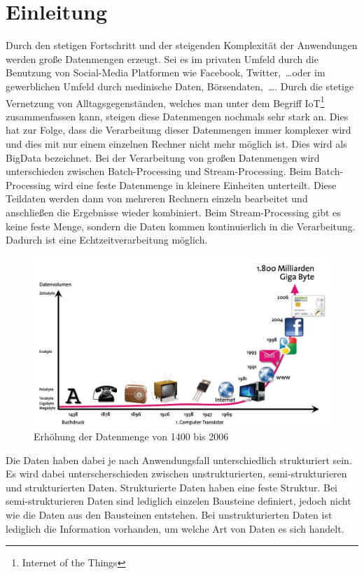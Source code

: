 \chapter{Einleitung}
Durch den stetigen Fortschritt und der steigenden Komplexität der Anwendungen
werden große Datenmengen erzeugt. Sei es im privaten Umfeld durch die Benutzung
von Social-Media Platformen wie Facebook, Twitter,~\dots oder im gewerblichen
Umfeld durch medinische Daten, Börsendaten,~\dots . Durch die stetige Vernetzung
von Alltagsgegenständen, welches man unter dem Begriff IoT\footnote{Internet of the Things}
zusammenfassen kann, steigen diese Datenmengen nochmals sehr stark an. Dies hat
zur Folge, dass die Verarbeitung dieser Datenmengen immer komplexer wird und dies
mit nur einem einzelnen Rechner nicht mehr möglich ist. Dies wird als BigData
bezeichnet. Bei der Verarbeitung von großen Datenmengen wird unterschieden
zwischen Batch-Processing und Stream-Processing. Beim Batch-Processing wird eine
feste Datenmenge in kleinere Einheiten unterteilt. Diese Teildaten werden dann
von mehreren Rechnern einzeln bearbeitet und anschließen die Ergebnisse wieder
kombiniert. Beim Stream-Processing gibt es keine feste Menge, sondern die Daten
kommen kontinuierlich in die Verarbeitung. Dadurch ist eine Echtzeitverarbeitung
möglich.

\begin{figure}
\centering
\includegraphics[scale=0.375]{images/bitkom-lf-bigdata-2012-data_grow.jpg}
\caption{Erhöhung der Datenmenge von 1400 bis 2006 \parencite{Weber2012}}
\label{fig:data-grow}
\end{figure}

Die Daten haben dabei je nach Anwendungsfall unterschiedlich strukturiert sein.
Es wird dabei unterscherschieden zwischen unstrukturierten, semi-strukturieren
und strukturierten Daten. Strukturierte Daten haben eine feste Struktur. Bei
semi-strukturieren Daten sind lediglich einzelen Bausteine definiert,
jedoch nicht wie die Daten aus den Bausteinen entstehen. Bei unstrukturierten
Daten ist lediglich die Information vorhanden, um welche Art von Daten es sich
handelt.

